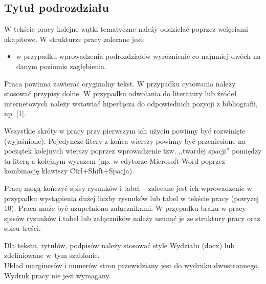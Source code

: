 \subsection{Tytuł podrozdziału}

W tekście pracy kolejne wątki tematyczne należy oddzielać poprzez wcięciami akapitowe. W strukturze pracy zalecane jest:
\begin{itemize} 
    \item w przypadku wprowadzenia podrozdziałów wyróżnienie co najmniej dwóch na danym poziomie zagłębienia.
\end{itemize}

Praca powinna zawierać oryginalny tekst. W przypadku cytowania należy stosować przypisy dolne. W przypadku odwołania do literatury lub źródeł internetowych należy wstawiać hiperłącza do odpowiednich pozycji z bibliografii, np. [1].
 
Wszystkie skróty w pracy przy pierwszym ich użyciu powinny być rozwinięte (wyjaśnione). Pojedyncze litery z końca wierszy powinny być przeniesione na początek kolejnych wierszy poprzez wprowadzenie tzw. ,,twardej spacji'' pomiędzy tą literą a kolejnym wyrazem (np. w edytorze Microsoft Word poprzez kombinację klawiszy Ctrl+Shift+Spacja).

Pracę mogą kończyć spisy rysunków i tabel – zalecane jest ich wprowadzenie w przypadku wystąpienia dużej liczby rysunków lub tabel w tekście pracy (powyżej 10). Praca może być uzupełniona załącznikami. W przypadku braku w pracy spisów rysunków i tabel lub załączników należy usunąć je ze struktury pracy oraz spisu treści.

Dla tekstu, tytułów, podpisów należy stosować style Wydziału (docx) lub zdefiniowane w~tym szablonie.\\
Układ marginesów i numerów stron przewidziany jest do wydruku dwustronnego.\\
Wydruk pracy nie jest wymagany.


